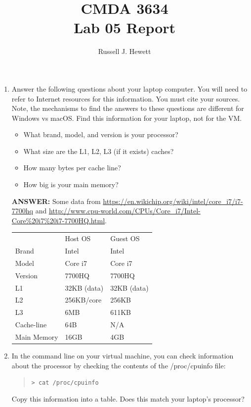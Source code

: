 \documentclass[letter]{article}
\title{CMDA 3634 \\ Lab 05 Report}
\author{Russell J. Hewett}
\date{}
\newcommand{\cmd}[1]{\begin{quote}\texttt{> #1}\end{quote}}
\begin{document}
\maketitle

    \begin{enumerate}
        \item Answer the following questions about your laptop computer.  You will need to refer to Internet resources for this information.  You must cite your sources.  Note, the mechanisms to find the answers to these questions are different for Windows vs macOS.  Find this information for your laptop, not for the VM.
            \begin{itemize}
                \item What brand, model, and version is your processor?
                \item What size are the L1, L2, L3 (if it exists) caches?
                \item How many bytes per cache line? 
                \item How big is your main memory?
            \end{itemize}
        
        \textbf{ANSWER:} %
        Some data from \url{https://en.wikichip.org/wiki/intel/core_i7/i7-7700hq} and \url{http://www.cpu-world.com/CPUs/Core_i7/Intel-Core%20i7%20i7-7700HQ.html}.
        \begin{tabular}{lll}
                    & Host OS     & Guest OS \\
        Brand       & Intel       & Intel    \\
        Model       & Core i7     & Core i7  \\
        Version     & 7700HQ      & 7700HQ   \\
        L1          & 32KB (data) & 32KB (data) \\
        L2          & 256KB/core  & 256KB \\
        L3          & 6MB         & 611KB \\
        Cache-line  & 64B         & N/A \\
        Main Memory & 16GB        & 4GB
        \end{tabular}

        \item In the command line on your virtual machine, you can check information about the processor by checking the contents of the /proc/cpuinfo file: \cmd{cat /proc/cpuinfo}
        Copy this information into a table. Does this match your laptop's 
        processor? 
        

\end{enumerate}
\end{document}
